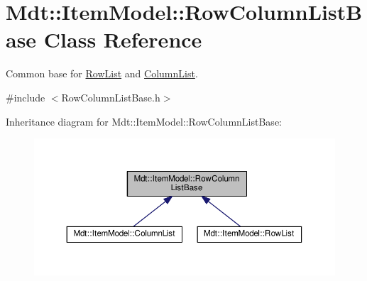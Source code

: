 \hypertarget{class_mdt_1_1_item_model_1_1_row_column_list_base}{}\section{Mdt\+:\+:Item\+Model\+:\+:Row\+Column\+List\+Base Class Reference}
\label{class_mdt_1_1_item_model_1_1_row_column_list_base}


Common base for \hyperlink{class_mdt_1_1_item_model_1_1_row_list}{Row\+List} and \hyperlink{class_mdt_1_1_item_model_1_1_column_list}{Column\+List}.  




{\ttfamily \#include $<$Row\+Column\+List\+Base.\+h$>$}



Inheritance diagram for Mdt\+:\+:Item\+Model\+:\+:Row\+Column\+List\+Base\+:
\nopagebreak
\begin{figure}[H]
\begin{center}
\leavevmode
\includegraphics[width=350pt]{class_mdt_1_1_item_model_1_1_row_column_list_base__inherit__graph}
\end{center}
\end{figure}
